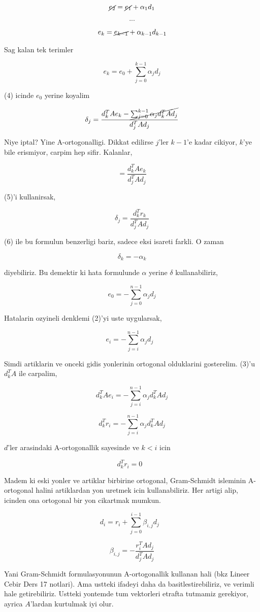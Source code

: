 \documentclass[12pt,fleqn]{article}\usepackage{../common}
\begin{document}
\[ \cancel{e_{2}} = \cancel{e_1} + \alpha_1 d_1\]

\[ ... \]

\[ e_{k} = \cancel{e_{k-1}} + \alpha_{k-1} d_{k-1}\]


Sag kalan tek terimler 

\[ e_k = e_0 + \sum _{ j=0}^{k-1} \alpha_j d_j \]

(4) icinde $e_0$ yerine koyalim

\[ \delta_j = \frac{ d_k^T A e_k - \cancel{\sum _{ j=0}^{k-1} \alpha_j d_k^T A d_j}}
{ d_j^T A d_j } 
\]

Niye iptal? Yine A-ortogonalligi. Dikkat edilirse $j$'ler $k-1$'e kadar
cikiyor, $k$'ye bile erismiyor, carpim hep sifir. Kalanlar,

\[  = \frac{ d_k^T A e_k}
{ d_j^T A d_j } 
\]

(5)'i kullanirsak, 

\[ \delta_j = \frac{ d_k^T r_k}
{ d_j^T A d_j } 
\]


(6) ile bu formulun benzerligi bariz, sadece eksi isareti farkli. O zaman 

\[ \delta_k = -\alpha_k \]

diyebiliriz. Bu demektir ki hata formulunde $\alpha$ yerine $\delta$
kullanabiliriz, 

\[ e_0 = -\sum _{ j=0}^{n-1} \alpha_j d_j \]

Hatalarin ozyineli denklemi (2)'yi uste uygularsak, 

\[ e_i = -\sum _{ j=i}^{n-1} \alpha_j d_j 
\ \ \ \label{3}
\]

Simdi artiklarin ve onceki gidis yonlerinin ortogonal olduklarini
gosterelim. (3)'u $d_k^TA$ ile carpalim, 

\[ d_k^TAe_i = -\sum _{ j=i}^{n-1} \alpha_j  d_k^TAd_j 
\]

\[ d_k^Tr_i = -\sum _{ j=i}^{n-1} \alpha_j  d_k^TAd_j 
\]

$d$'ler arasindaki A-ortogonallik sayesinde ve $k < i$ icin 

\[ d_k^Tr_i = 0
\ \ \ \label{9}
\]

Madem ki eski yonler ve artiklar birbirine ortogonal, Gram-Schmidt
isleminin A-ortogonal halini artiklardan yon uretmek icin
kullanabiliriz. Her artigi alip, icinden ona ortogonal bir yon cikartmak
mumkun.

\[ d_i = r_i + \sum _{ j=0}^{i-1} \beta_{i,j}d_j 
\ \ \ \label{10}
\]

\[ \beta_{i,j} = - \frac{ r_i^TAd_j}{d_j^TAd_j} \]

Yani Gram-Schmidt formulasyonunun A-ortogonallik kullanan hali (bkz Lineer
Cebir Ders 17 notlari). Ama ustteki ifadeyi daha da basitlestirebiliriz, ve
verimli hale getirebiliriz. Ustteki yontemde tum vektorleri etrafta
tutmamiz gerekiyor, ayrica $A$'lardan kurtulmak iyi olur. 
\end{document}
